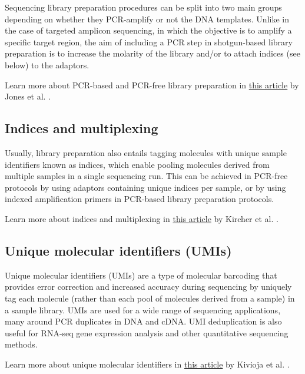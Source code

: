 \documentclass[
]{book}
\begin{document}
Sequencing library preparation procedures can be split into two main groups depending on whether they PCR-amplify or not the DNA templates. Unlike in the case of targeted amplicon sequencing, in which the objective is to amplify a specific target region, the aim of including a PCR step in shotgun-based library preparation is to increase the molarity of the library and/or to attach indices (see below) to the adaptors.

Learn more about PCR-based and PCR-free library preparation in \href{https://www.pnas.org/doi/abs/10.1073/pnas.1519288112}{this article} by Jones et al. \citep{Jones2015-bk}.

\hypertarget{indices-multiplexing}{%
\subsection*{Indices and multiplexing}\label{indices-multiplexing}}

Usually, library preparation also entails tagging molecules with unique sample identifiers known as indices, which enable pooling molecules derived from multiple samples in a single sequencing run. This can be achieved in PCR-free protocols by using adaptors containing unique indices per sample, or by using indexed amplification primers in PCR-based library preparation protocols.

Learn more about indices and multiplexing in \href{https://academic.oup.com/nar/article/40/1/e3/1287690}{this article} by Kircher et al. \citep{Kircher2012-vy}.

\hypertarget{unique-molecular-identifiers}{%
\subsection*{Unique molecular identifiers (UMIs)}\label{unique-molecular-identifiers}}

Unique molecular identifiers (UMIs) are a type of molecular barcoding that provides error correction and increased accuracy during sequencing by uniquely tag each molecule (rather than each pool of molecules derived from a sample) in a sample library. UMIs are used for a wide range of sequencing applications, many around PCR duplicates in DNA and cDNA. UMI deduplication is also useful for RNA-seq gene expression analysis and other quantitative sequencing methods.

Learn more about unique molecular identifiers in \href{https://www.nature.com/articles/nmeth.1778}{this article} by Kivioja et al. \citep{Kivioja2011-fe}.
\end{document}
